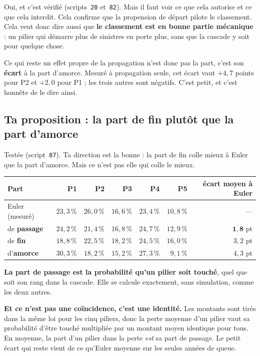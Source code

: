 \documentclass[11pt,a4paper]{article}
\begin{document}
Oui, et c'est vérifié (scripts~\texttt{20} et~\texttt{82}). Mais il faut voir ce que cela autorise
et ce que cela interdit. Cela
confirme que la propension de départ pilote le classement. Cela veut donc dire aussi que
\textbf{le classement est en bonne partie mécanique} : un pilier qui démarre plus de sinistres en
porte plus, sans que la cascade y soit pour quelque chose.

Ce qui reste un effet propre de la propagation n'est donc pas la part, c'est son \textbf{écart} à
la part d'amorce. Mesuré à propagation seule, cet écart vaut $+4{,}7$ points pour P2 et $+2{,}0$
pour P1 ; les trois autres sont négatifs. C'est petit, et c'est honnête de le dire ainsi.

\subsection*{Ta proposition : la part de fin plutôt que la part d'amorce}

Testée (script~\texttt{87}). Ta direction est la bonne : la part de fin colle mieux à Euler que la
part d'amorce. Mais ce n'est pas elle qui colle le mieux.

\begin{center}
\begin{tabular}{@{}l r r r r r r@{}}
\toprule
\textbf{Part} & \textbf{P1} & \textbf{P2} & \textbf{P3} & \textbf{P4} & \textbf{P5} & \textbf{écart moyen à Euler} \\
\midrule
Euler (mesuré)   & $23{,}3\,\%$ & $26{,}0\,\%$ & $16{,}6\,\%$ & $23{,}4\,\%$ & $10{,}8\,\%$ & --- \\
\midrule
de \textbf{passage} & $24{,}2\,\%$ & $21{,}4\,\%$ & $16{,}8\,\%$ & $24{,}7\,\%$ & $12{,}9\,\%$ & $\mathbf{1{,}8}$ pt \\
de \textbf{fin}     & $18{,}8\,\%$ & $22{,}5\,\%$ & $18{,}2\,\%$ & $24{,}5\,\%$ & $16{,}0\,\%$ & $3{,}2$ pt \\
d'\textbf{amorce}   & $30{,}3\,\%$ & $18{,}2\,\%$ & $15{,}2\,\%$ & $27{,}3\,\%$ & $9{,}1\,\%$  & $4{,}3$ pt \\
\bottomrule
\end{tabular}
\end{center}

\textbf{La part de passage est la probabilité qu'un pilier soit touché}, quel que soit son rang
dans la cascade. Elle se calcule exactement, sans simulation, comme les deux autres.

\textbf{Et ce n'est pas une coïncidence, c'est une identité.} Les montants sont tirés dans la même
loi pour les cinq piliers, donc la perte moyenne d'un pilier vaut sa probabilité d'être touché
multipliée par un montant moyen identique pour tous. En moyenne, la part d'un pilier dans la perte
\emph{est} sa part de passage. Le petit écart qui reste vient de ce qu'Euler moyenne sur les seules
années de queue.
\end{document}
